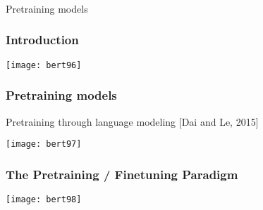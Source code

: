 \begin{frame}[fragile]\frametitle{}
\begin{center}
{\Large Pretraining models}
\end{center}
\end{frame}


\begin{frame}[fragile]\frametitle{Introduction}

			
			\begin{center}
			\texttt{[image: bert96]}
			\end{center}		
			

\end{frame}

\begin{frame}[fragile]\frametitle{Pretraining models}
Pretraining through language modeling [Dai and Le, 2015]
			
			\begin{center}
			\texttt{[image: bert97]}
			\end{center}		
			

\end{frame}

\begin{frame}[fragile]\frametitle{The Pretraining / Finetuning Paradigm}

			
			\begin{center}
			\texttt{[image: bert98]}
			\end{center}		
			

\end{frame}



